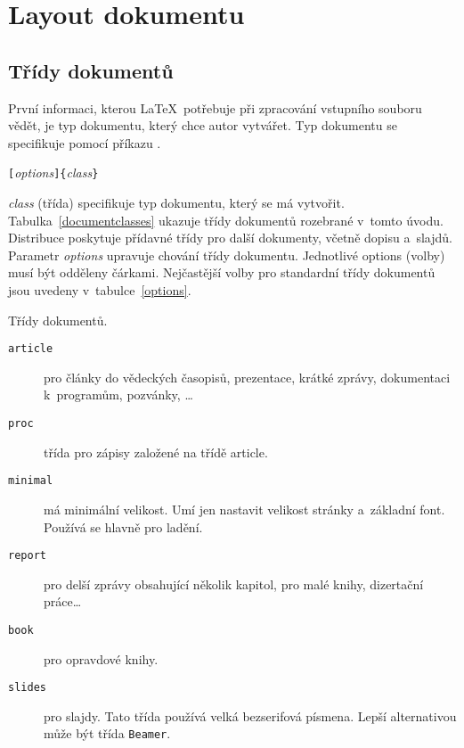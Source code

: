  
\section{Layout dokumentu}
 
\subsection {Třídy dokumentů}\label{sec:documentclass}

První informaci, kterou \LaTeX\ potřebuje při zpracování vstupního
souboru vědět, je typ dokumentu, který chce autor vytvářet.
Typ dokumentu se specifikuje pomocí příkazu .
\begin{lscommand}
\verb|[|\emph{options}\verb|]{|\emph{class}\verb|}|
\end{lscommand}
\noindent \emph{class} (třída) specifikuje typ dokumentu, který se má vytvořit.
Tabulka~\ref{documentclasses} ukazuje třídy dokumentů rozebrané
v~tomto úvodu. Distribuce \LaTeXe{} poskytuje přídavné
třídy pro další dokumenty, včetně dopisu a~slajdů. Parametr
\emph{options} upravuje chování třídy dokumentu.
Jednotlivé options (volby) musí být odděleny čárkami. Nejčastější
volby pro standardní třídy dokumentů jsou uvedeny v~tabulce~\ref{options}.

\begin{table}[!bp]
\caption{Třídy dokumentů.} \label{documentclasses}
\begin{lined}{\textwidth}
\begin{description}
 
\item [\normalfont\texttt{article}] pro články do vědeckých časopisů, prezentace,
  krátké zprávy, dokumentaci k~programům, pozvánky, \ldots
\item [\normalfont\texttt{proc}] třída pro zápisy založené na třídě article.
\item [\normalfont\texttt{minimal}] má minimální velikost.
Umí jen nastavit velikost stránky a~základní font. Používá se hlavně
pro ladění.
\item [\normalfont\texttt{report}] pro delší zprávy obsahující několik kapitol,
pro malé knihy, dizertační práce\ldots {}
\item [\normalfont\texttt{book}] pro opravdové knihy.
\item [\normalfont\texttt{slides}] pro slajdy. Tato třída používá velká bezserifová písmena. Lepší alternativou může být třída \verb|Beamer|.
\end{description}
\end{lined}
\end{table}

